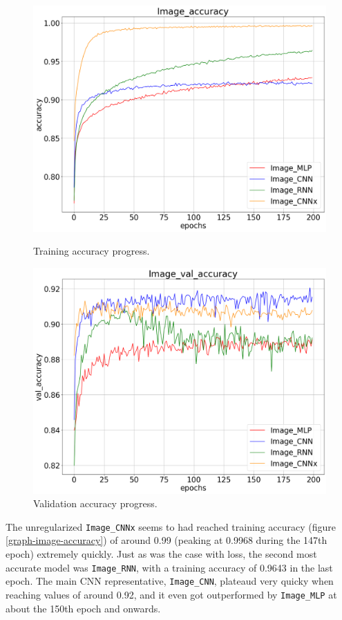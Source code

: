 \begin{figure}[!h]
    \centering
    \begin{minipage}{0.48\textwidth}
        \centering
        \includegraphics[width=\linewidth]{obrazky-figures/Image_experiment/accuracy_2023-03-27_13:08:08.png}
        \caption{Training accuracy progress.}
        \label{graph-image-accuracy}
    \end{minipage}\hfill
    \begin{minipage}{0.48\textwidth}
        \centering
        \includegraphics[width=\linewidth]{obrazky-figures/Image_experiment/val_accuracy_2023-03-27_13:08:09.png}
        \caption{Validation accuracy progress.}
        \label{graph-image-val_accuracy}
    \end{minipage}
\end{figure}
The unregularized \texttt{Image\_CNNx} seems to had reached training accuracy (figure \ref{graph-image-accuracy}) of around 0.99
(peaking at 0.9968 during the 147th epoch) extremely quickly. Just as was the case with loss, the second most
accurate model was \texttt{Image\_RNN}, with a training accuracy of 0.9643 in the last epoch.
The main CNN representative, \texttt{Image\_CNN}, plateaud very quicky when reaching values of around 0.92, and it even
got outperformed by \texttt{Image\_MLP} at about the 150th epoch and onwards.

